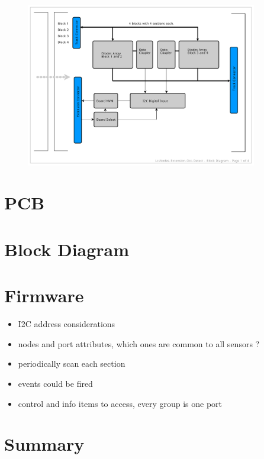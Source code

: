 \begin{figure}[htbp]
    \centering
    \includegraphics[page=4, width=0.9\textwidth]{./Schematics/Schematic_LcsNodes-Extension-Occ-Detect.pdf}
\end{figure}
\FloatBarrier

\section{PCB}

\section{Block Diagram}



\section{Firmware}

\begin{itemize}
\item I2C address considerations
\item nodes and port attributes, which ones are common to all sensors ?
\item periodically scan each section
\item events could be fired
\item control and info items to access, every group is one port
\end{itemize}

\section{Summary}

